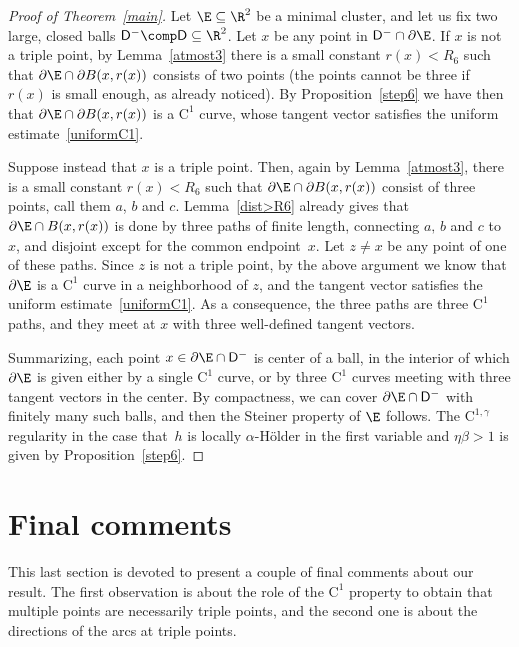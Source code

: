 \begin{proof}[Proof of Theorem~\ref{main}]
Let $\E\subseteq\R^2$ be a minimal cluster, and let us fix two large, closed balls $\mathsf{D}^-\comp \mathsf{D}\subseteq\R^2$. Let $x$ be any point in $\mathsf{D}^- \cap \partial\E$. If $x$ is not a triple point, by Lemma~\ref{atmost3} there is a small constant $r(x)<R_6$ such that $\partial\E\cap\partial B(x,r(x))$ consists of two points (the points cannot be three if $r(x)$ is small enough, as already noticed). By Proposition~\ref{step6} we have then that $\partial\E\cap\partial B(x,r(x))$ is a $\mathrm{C}^1$ curve, whose tangent vector satisfies the uniform estimate~\eqref{uniformC1}.

Suppose instead that $x$ is a triple point. Then, again by Lemma~\ref{atmost3}, there is a small constant $r(x)<R_6$ such that $\partial\E\cap\partial B(x,r(x))$ consist of three points, call them $a$, $b$ and $c$. Lemma~\ref{dist>R6} already gives that $\partial\E\cap B(x,r(x))$ is done by three paths of finite length, connecting $a,\, b$ and $c$ to $x$, and disjoint except for the common endpoint~$x$. Let $z\neq x$ be any point of one of these paths. Since $z$ is not a triple point, by the above argument we know that $\partial\E$ is a $\mathrm{C}^1$ curve in a neighborhood of $z$, and the tangent vector satisfies the uniform estimate~\eqref{uniformC1}. As a consequence, the three paths are three $\mathrm{C}^1$ paths, and they meet at $x$ with three well-defined tangent vectors.

Summarizing, each point $x\in \partial \E \cap \mathsf{D}^-$ is center of a ball, in the interior of which $\partial\E$ is given either by a single $\mathrm{C}^1$ curve, or by three $\mathrm{C}^1$ curves meeting with three tangent vectors in the center. By compactness, we can cover $\partial\E\cap \mathsf{D}^-$ with finitely many such balls, and then the Steiner property of $\E$ follows. The $\mathrm{C}^{1,\gamma}$ regularity in the case that~$h$ is locally $\alpha$-H\"older in the first variable and $\eta\beta>1$ is given by Proposition~\ref{step6}.
\end{proof}

\section{Final comments}\label{s:final}

This last section is devoted to present a couple of final comments about our result. The first observation is about the role of the $\mathrm{C}^1$ property to obtain that multiple points are necessarily triple points, and the second one is about the directions of the arcs at triple points.

